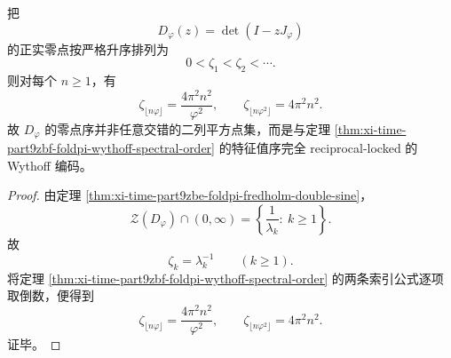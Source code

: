 \begin{corollary}\label{cor:xi-time-part9zbf-foldpi-fredholm-zero-wythoff-order}
把
\[
D_\varphi(z)=\det(I-zJ_\varphi)
\]
的正实零点按严格升序排列为
\[
0<\zeta_1<\zeta_2<\cdots.
\]
则对每个 \(n\ge 1\)，有
\[
\zeta_{\lfloor n\varphi\rfloor}
=
\frac{4\pi^2n^2}{\varphi^2},
\qquad
\zeta_{\lfloor n\varphi^2\rfloor}
=
4\pi^2n^2.
\]
故 \(D_\varphi\) 的零点序并非任意交错的二列平方点集，而是与定理 \ref{thm:xi-time-part9zbf-foldpi-wythoff-spectral-order} 的特征值序完全 reciprocal-locked 的 Wythoff 编码。
\end{corollary}
\begin{proof}
由定理 \ref{thm:xi-time-part9zbe-foldpi-fredholm-double-sine}，
\[
\mathcal Z(D_\varphi)\cap (0,\infty)
=
\left\{\frac{1}{\lambda_k}:\ k\ge 1\right\}.
\]
故
\[
\zeta_k=\lambda_k^{-1}
\qquad (k\ge 1).
\]
将定理 \ref{thm:xi-time-part9zbf-foldpi-wythoff-spectral-order} 的两条索引公式逐项取倒数，便得到
\[
\zeta_{\lfloor n\varphi\rfloor}
=
\frac{4\pi^2n^2}{\varphi^2},
\qquad
\zeta_{\lfloor n\varphi^2\rfloor}
=
4\pi^2n^2.
\]
证毕。
\end{proof}

